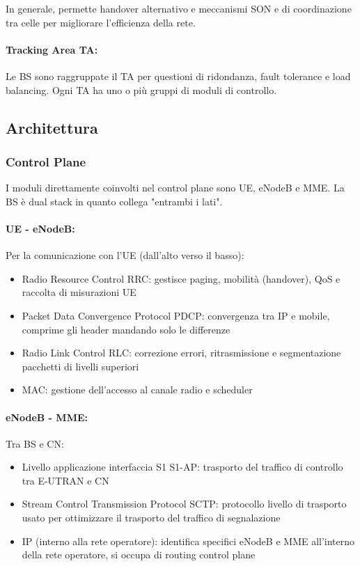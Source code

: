 In generale, permette handover alternativo e meccanismi SON e di coordinazione tra celle per migliorare l'efficienza della rete.

\paragraph{Tracking Area TA:} Le BS sono raggruppate il TA per questioni di ridondanza, fault tolerance e load balancing. Ogni TA ha uno o più gruppi di moduli di controllo.

\subsection{Architettura}

\subsubsection{Control Plane}

I moduli direttamente coinvolti nel control plane sono UE, eNodeB e MME. La BS è dual stack in quanto collega "entrambi i lati". 

\paragraph{UE - eNodeB:} Per la comunicazione con l'UE (dall'alto verso il basso):
\begin{itemize}
    \item Radio Resource Control RRC: gestisce paging, mobilità (handover), QoS e raccolta di misurazioni UE
    
    \item Packet Data Convergence Protocol PDCP: convergenza tra IP e mobile, comprime gli header mandando solo le differenze
    
    \item Radio Link Control RLC: correzione errori, ritrasmissione e segmentazione pacchetti di livelli superiori
    
    \item MAC: gestione dell'accesso al canale radio e scheduler
\end{itemize}

\paragraph{eNodeB - MME:} Tra BS e CN:
\begin{itemize}
    \item Livello applicazione interfaccia S1 S1-AP: trasporto del traffico di controllo tra E-UTRAN e CN
    
    \item Stream Control Transmission Protocol SCTP: protocollo livello di trasporto usato per ottimizzare il trasporto del traffico di segnalazione
    
    \item IP (interno alla rete operatore): identifica specifici eNodeB e MME all'interno della rete operatore, si occupa di routing control plane
\end{itemize}

